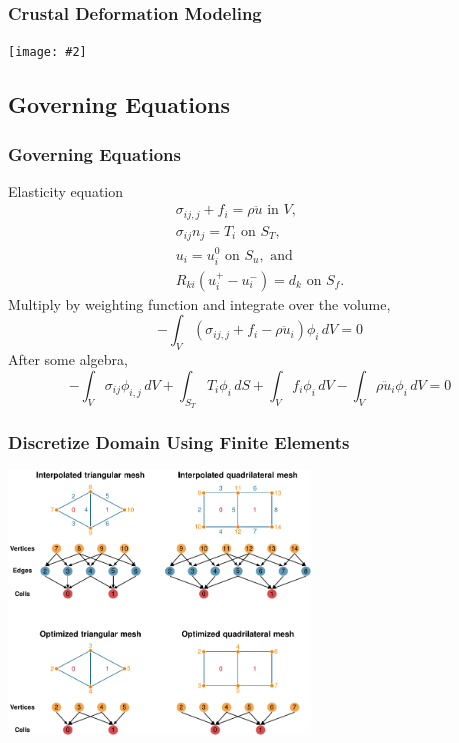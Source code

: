 \documentclass[aspectratio=169,hyperref=colorlinks]{beamer}
\newcommand{\includefigure}[2][]{{\centering\texttt{[image: \#2]}\par}}
\begin{document}
\begin{frame}
  \frametitle{Crustal Deformation Modeling}

  \includefigure[height=7.2cm]{figs/workflow}
  
\end{frame}


\subsection{Governing Equations}

\begin{frame}
  \frametitle{Governing Equations}
  \summary{}

  \vfill
  Elasticity equation
  \begin{gather}
    \sigma_{ij,j} + f_i = \rho \ddot{u} \text{ in } V, \\
    \sigma_{ij} n_j = T_i \text{ on } S_T, \\
    u_i = u_i^0 \text{ on } S_u, \text{ and } \\
    R_{ki}(u^{+}_i - u^{-}_i) = d_k \text{ on } S_f.
  \end{gather}
  Multiply by weighting function and integrate over the volume,
  \begin{equation}
    -\int_V (\sigma_{ij,j} + f_i - \rho \ddot{u}_i) \phi_i \, dV = 0
  \end{equation}
  After some algebra,
  \begin{equation}
    -\int_V \sigma_{ij} \phi_{i,j} \, dV 
    + \int_{S_T} T_i \phi_i\, dS
    + \int_V f_i \phi_i \, dV 
    - \int_V \rho \ddot{u}_i \phi_i \, dV = 0
  \end{equation}
  \vfill
  
\end{frame}


\begin{frame}
  \frametitle{Discretize Domain Using Finite Elements}
 
   \begin{center}
     \includegraphics[height=7.0cm]{figs/meshtopology}
   \end{center}
   
 \end{frame}
 
\end{document}
